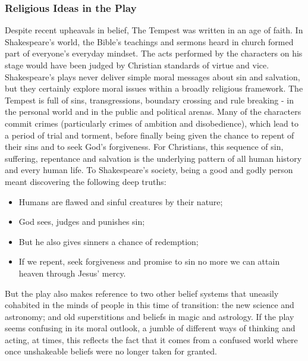 		\subsubsection{Religious Ideas in the Play}
			Despite recent upheavals in belief, The Tempest was written in an age of faith. In Shakespeare's
			world, the Bible's teachings and sermons heard in church formed part of everyone's everyday mindset. The acts performed by the characters on his stage would have been judged by Christian standards of virtue and vice. Shakespeare's plays never deliver simple moral messages about sin and salvation, but they certainly explore moral issues within a broadly religious framework. The Tempest is full of sins, transgressions, boundary crossing and rule breaking - in the personal world and in the public and political arenas. Many of the characters commit crimes (particularly crimes of ambition and disobedience), which lead to a period of trial and torment, before finally being given the chance to repent of their sins and to seek God's forgiveness. For Christians, this sequence of sin, suffering, repentance and salvation is the underlying pattern of all human history and every human life. To Shakespeare's society, being a good and godly person meant discovering the following deep truths:
			\begin{itemize}
				\item Humans are flawed and sinful creatures by their nature;
				\item God sees, judges and punishes sin;
				\item But he also gives sinners a chance of redemption;
				\item If we repent, seek forgiveness and promise to sin no more we can attain heaven through Jesus' mercy.
			\end{itemize}
			But the play also makes reference to two other belief systems that uneasily cohabited in the minds
			of people in this time of transition: the new science and astronomy; and old superstitions and beliefs
			in magic and astrology. If the play seems confusing in its moral outlook, a jumble of different ways of
			thinking and acting, at times, this reflects the fact that it comes from a confused world where once
			unshakeable beliefs were no longer taken for granted.

